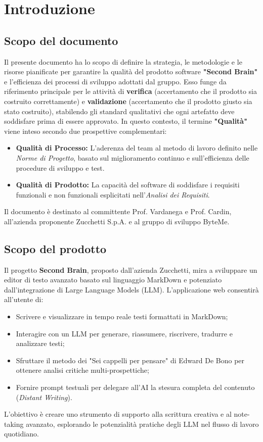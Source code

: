 \documentclass[11pt,a4paper]{article}
\begin{document}
\newpage

\tableofcontents
\thispagestyle{empty}
\newpage

\setcounter{page}{1}

\section{Introduzione}

\subsection{Scopo del documento}
Il presente documento ha lo scopo di definire la strategia, le metodologie e le risorse pianificate per garantire la qualità del prodotto software \textbf{"Second Brain"} e l'efficienza dei processi di sviluppo adottati dal gruppo. Esso funge da riferimento principale per le attività di \textbf{verifica} (accertamento che il prodotto sia costruito correttamente) e \textbf{validazione} (accertamento che il prodotto giusto sia stato costruito), stabilendo gli standard qualitativi che ogni artefatto deve soddisfare prima di essere approvato.
In questo contesto, il termine \textbf{"Qualità"} viene inteso secondo due prospettive complementari:
\begin{itemize}
    \item \textbf{Qualità di Processo:} L'aderenza del team al metodo di lavoro definito nelle \textit{Norme di Progetto}, basato sul miglioramento continuo e sull'efficienza delle procedure di sviluppo e test.
    \item \textbf{Qualità di Prodotto:} La capacità del software di soddisfare i requisiti funzionali e non funzionali esplicitati nell'\textit{Analisi dei Requisiti}.
\end{itemize}
Il documento è destinato al committente Prof. Vardanega e Prof. Cardin, all'azienda proponente Zucchetti S.p.A. e al gruppo di sviluppo ByteMe.

\subsection{Scopo del prodotto}
Il progetto \textbf{Second Brain}, proposto dall'azienda Zucchetti, mira a sviluppare un editor di testo avanzato basato sul linguaggio MarkDown e potenziato dall'integrazione di Large Language Models (LLM).
L'applicazione web consentirà all'utente di:
\begin{itemize}
    \item Scrivere e visualizzare in tempo reale testi formattati in MarkDown;
    \item Interagire con un LLM per generare, riassumere, riscrivere, tradurre e analizzare testi;
    \item Sfruttare il metodo dei "Sei cappelli per pensare" di Edward De Bono per ottenere analisi critiche multi-prospettiche;
    \item Fornire prompt testuali per delegare all'AI la stesura completa del contenuto (\textit{Distant Writing}).
\end{itemize}
L'obiettivo è creare uno strumento di supporto alla scrittura creativa e al note-taking avanzato, esplorando le potenzialità pratiche degli LLM nel flusso di lavoro quotidiano.
\end{document}
